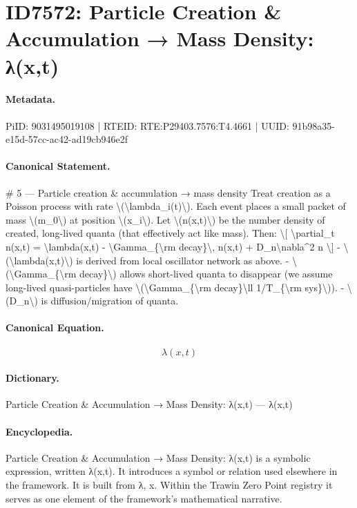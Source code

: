\section*{ID7572: Particle Creation \& Accumulation → Mass Density: λ(x,t)}
\paragraph{Metadata.}
PiID: 9031495019108 | RTEID: RTE:P29403.7576:T4.4661 | UUID: 91b98a35-e15d-57cc-ac42-ad19cb946e2f

\paragraph{Canonical Statement.}
\# 5 — Particle creation \& accumulation → mass density Treat creation as a Poisson process with rate \textbackslash{}(\textbackslash{}lambda\_i(t)\textbackslash{}). Each event places a small packet of mass \textbackslash{}(m\_0\textbackslash{}) at position \textbackslash{}(x\_i\textbackslash{}). Let \textbackslash{}(n(x,t)\textbackslash{}) be the number density of created, long-lived quanta (that effectively act like mass). Then: \textbackslash{}[ \textbackslash{}partial\_t n(x,t) = \textbackslash{}lambda(x,t) - \textbackslash{}Gamma\_\{\textbackslash{}rm decay\}\textbackslash{}, n(x,t) + D\_n\textbackslash{}nabla\textasciicircum{}2 n \textbackslash{}] - \textbackslash{}(\textbackslash{}lambda(x,t)\textbackslash{}) is derived from local oscillator network as above. - \textbackslash{}(\textbackslash{}Gamma\_\{\textbackslash{}rm decay\}\textbackslash{}) allows short-lived quanta to disappear (we assume long-lived quasi-particles have \textbackslash{}(\textbackslash{}Gamma\_\{\textbackslash{}rm decay\}\textbackslash{}ll 1/T\_\{\textbackslash{}rm sys\}\textbackslash{})). - \textbackslash{}(D\_n\textbackslash{}) is diffusion/migration of quanta.

\paragraph{Canonical Equation.}
\[
\lambda(x,t)
\]

\paragraph{Dictionary.}
Particle Creation \& Accumulation → Mass Density: λ(x,t) — λ(x,t)

\paragraph{Encyclopedia.}
Particle Creation \& Accumulation → Mass Density: λ(x,t) is a symbolic expression, written λ(x,t). It introduces a symbol or relation used elsewhere in the framework. It is built from λ, x. Within the Trawin Zero Point registry it serves as one element of the framework's mathematical narrative.
